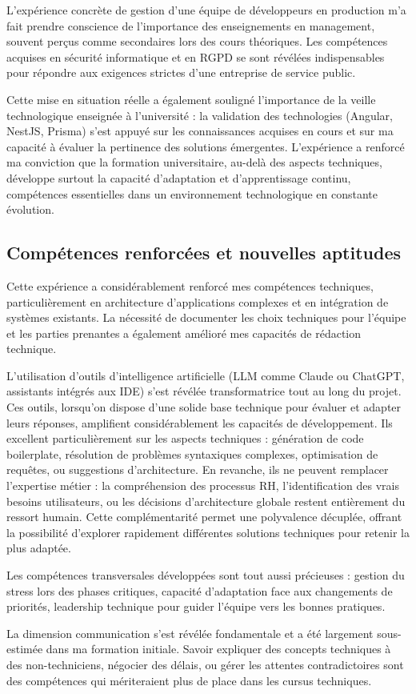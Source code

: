 L'expérience concrète de gestion d'une équipe de développeurs en production m'a fait prendre conscience de l'importance des enseignements en management, souvent perçus comme secondaires lors des cours théoriques.
Les compétences acquises en sécurité informatique et en RGPD se sont révélées indispensables pour répondre aux exigences strictes d'une entreprise de service public.

Cette mise en situation réelle a également souligné l'importance de la veille technologique enseignée à l'université : la validation des technologies (Angular, NestJS, Prisma) s'est appuyé sur les connaissances acquises en cours et sur ma capacité à évaluer la pertinence des solutions émergentes.
L'expérience a renforcé ma conviction que la formation universitaire, au-delà des aspects techniques, développe surtout la capacité d'adaptation et d'apprentissage continu, compétences essentielles dans un environnement technologique en constante évolution.

\subsection{Compétences renforcées et nouvelles aptitudes}
Cette expérience a considérablement renforcé mes compétences techniques, particulièrement en architecture d'applications complexes et en intégration de systèmes existants.
La nécessité de documenter les choix techniques pour l'équipe et les parties prenantes a également amélioré mes capacités de rédaction technique.

L'utilisation d'outils d'intelligence artificielle (LLM comme Claude ou ChatGPT, assistants intégrés aux IDE) s'est révélée transformatrice tout au long du projet.
Ces outils, lorsqu'on dispose d'une solide base technique pour évaluer et adapter leurs réponses, amplifient considérablement les capacités de développement.
Ils excellent particulièrement sur les aspects techniques : génération de code boilerplate, résolution de problèmes syntaxiques complexes, optimisation de requêtes, ou suggestions d'architecture.
En revanche, ils ne peuvent remplacer l'expertise métier : la compréhension des processus RH, l'identification des vrais besoins utilisateurs, ou les décisions d'architecture globale restent entièrement du ressort humain.
Cette complémentarité permet une polyvalence décuplée, offrant la possibilité d'explorer rapidement différentes solutions techniques pour retenir la plus adaptée.

Les compétences transversales développées sont tout aussi précieuses : gestion du stress lors des phases critiques, capacité d'adaptation face aux changements de priorités, leadership technique pour guider l'équipe vers les bonnes pratiques.

La dimension communication s'est révélée fondamentale et a été largement sous-estimée dans ma formation initiale.
Savoir expliquer des concepts techniques à des non-techniciens, négocier des délais, ou gérer les attentes contradictoires sont des compétences qui mériteraient plus de place dans les cursus techniques.
